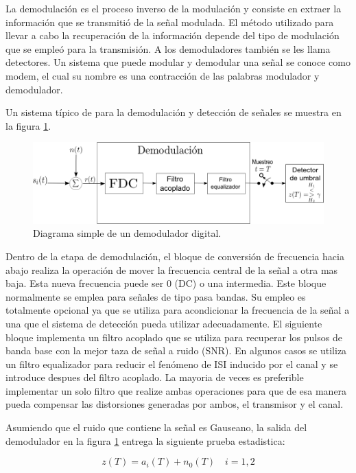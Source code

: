La demodulaci\'on es el proceso inverso de la modulaci\'on y consiste en
extraer la informaci\'on que se transmiti\'o de la se\~nal modulada. El m\'etodo
utilizado para llevar a cabo la recuperaci\'on de la informaci\'on depende del
tipo de modulaci\'on que se emple\'o para la transmisi\'on. A los demoduladores
tambi\'en se les llama detectores. Un sistema que puede modular y demodular una
se\~nal se conoce como modem, el cual su nombre es una contracci\'on de las
palabras modulador y demodulador. 

Un sistema t\'ipico de para la demodulaci\'on y detecci\'on de se\~nales se muestra en la
figura \ref{fig:simpledemod}. 

\begin{figure}[tp]
\centering
	\includegraphics[scale=0.5]{figs/simpledemod}
	\caption{Diagrama simple de un demodulador digital.}
	\label{fig:simpledemod}
\end{figure}

Dentro de la etapa de demodulaci\'on, el bloque de conversi\'on de frecuencia hacia abajo
realiza la operaci\'on de mover la frecuencia central de la se\~nal a otra mas baja. Esta nueva
frecuencia puede ser 0 (DC) o una intermedia. Este bloque normalmente se emplea para se\~nales de
tipo pasa bandas. Su empleo es totalmente opcional ya que se utiliza para acondicionar la frecuencia
de la se\~nal a una que el sistema de detecci\'on pueda utilizar adecuadamente. El siguiente bloque
implementa un filtro acoplado que se utiliza para recuperar los pulsos de banda base con la mejor
taza de se\~nal a ruido (SNR). En algunos casos se utiliza un filtro equalizador para reducir el
fen\'omeno de ISI inducido por el canal y se introduce despues del filtro acoplado. La mayoria de
veces es preferible implementar un solo filtro que realize ambas operaciones para que de esa manera
pueda compensar las distorsiones generadas por ambos, el transmisor y el canal.

Asumiendo que el ruido que contiene la se\~nal es Gauseano, la salida del demodulador en la figura
\ref{fig:simpledemod} entrega la siguiente prueba estadistica:

\begin{equation}
z(T)=a_i(T)+n_0(T) \quad i=1,2
\end{equation}

